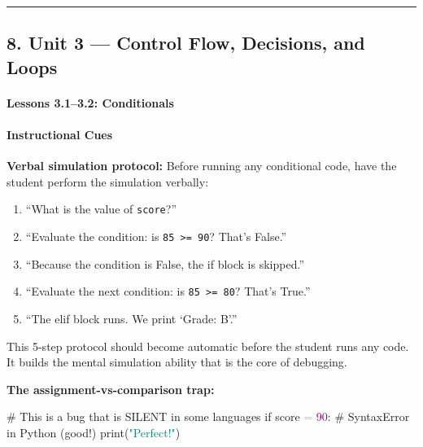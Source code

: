 \documentclass[
  justified,
  openright,
]{tufte-book}
\let\subsubsection\paragraph
\let\paragraph\paragraph
\newcommand{\BuiltInTok}[1]{#1}
\newcommand{\CommentTok}[1]{\textcolor{MidGray}{#1}}
\newcommand{\ControlFlowTok}[1]{\textcolor{BrandBlue}{#1}}
\newcommand{\DecValTok}[1]{\textcolor{Purple}{#1}}
\newcommand{\NormalTok}[1]{#1}
\newcommand{\OperatorTok}[1]{\textcolor{DarkGray}{#1}}
\newcommand{\StringTok}[1]{\textcolor{Teal}{#1}}
\newenvironment{Shaded}{%
  \begin{snugshade}
}{%
  \end{snugshade}
}
\let\subsubsection\paragraph
\let\paragraph\paragraph
\providecommand{\tightlist}{%
  \setlength{\itemsep}{0pt}\setlength{\parskip}{0pt}}
\begin{document}
\begin{center}\rule{0.5\linewidth}{0.5pt}\end{center}

\subsection{8. Unit 3 --- Control Flow, Decisions, and
Loops}\label{unit-3-control-flow-decisions-and-loops}

\subsubsection{Lessons 3.1--3.2:
Conditionals}\label{lessons-3.13.2-conditionals}

\paragraph{Instructional Cues}\label{instructional-cues-7}

\textbf{Verbal simulation protocol:} Before running any conditional
code, have the student perform the simulation verbally:

\begin{enumerate}
\def\labelenumi{\arabic{enumi}.}
\tightlist
\item
  ``What is the value of \texttt{score}?''
\item
  ``Evaluate the condition: is \texttt{85\ \textgreater{}=\ 90}? That's
  False.''
\item
  ``Because the condition is False, the if block is skipped.''
\item
  ``Evaluate the next condition: is \texttt{85\ \textgreater{}=\ 80}?
  That's True.''
\item
  ``The elif block runs. We print `Grade: B'.''
\end{enumerate}

This 5-step protocol should become automatic before the student runs any
code. It builds the mental simulation ability that is the core of
debugging.

\textbf{The assignment-vs-comparison trap:}

\begin{Shaded}
\begin{Highlighting}[]
\CommentTok{\# This is a bug that is SILENT in some languages}
\ControlFlowTok{if}\NormalTok{ score }\OperatorTok{=} \DecValTok{90}\NormalTok{:   }\CommentTok{\# SyntaxError in Python (good!)}
    \BuiltInTok{print}\NormalTok{(}\StringTok{"Perfect!"}\NormalTok{)}
\end{Highlighting}
\end{Shaded}
\end{document}
